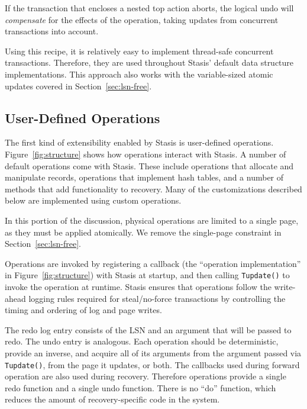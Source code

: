 \documentclass[letterpaper,twocolumn,10pt]{article}
\newcommand{\yad}{Stasis\xspace}
\newcommand{\yads}{Stasis'\xspace}
\begin{document}
If the transaction that encloses a nested top action aborts, the
logical undo will {\em compensate} for the effects of the operation, 
taking updates from concurrent transactions into account.

Using this recipe, it is relatively easy to implement thread-safe
concurrent transactions.  Therefore, they are used throughout \yads
default data structure implementations.  This approach also works 
with the variable-sized atomic updates covered in Section~\ref{sec:lsn-free}.





\subsection{User-Defined Operations}
\label{sec:operations}

The first kind of extensibility enabled by \yad is user-defined operations.
Figure~\ref{fig:structure} shows how operations interact with \yad.  A
number of default operations come with \yad.  These include operations
that allocate and manipulate records, operations that implement hash
tables, and a number of methods that add functionality to recovery.
Many of the customizations described below are implemented using
custom operations. 

In this portion of the discussion, physical operations are limited to a single
page, as they must be applied atomically. We remove the single-page
constraint in Section~\ref{sec:lsn-free}.

Operations are invoked by registering a callback (the ``operation
implementation'' in Figure~\ref{fig:structure}) with \yad at startup,
and then calling {\tt Tupdate()} to invoke the operation at runtime.
\yad ensures that operations follow the write-ahead logging rules
required for steal/no-force transactions by controlling the timing and
ordering of log and page writes.  

The redo log entry consists of the
LSN and an argument that will be passed to redo.  The undo entry is
analogous. Each
operation should be deterministic, provide an inverse, and acquire all
of its arguments from the argument passed via {\tt Tupdate()},
from the page it updates, or both.  The callbacks used during forward
operation are also used during recovery.  Therefore operations provide
a single redo function and a single undo function.  There is no ``do''
function, which reduces the amount of recovery-specific code in the
system.
\end{document}
